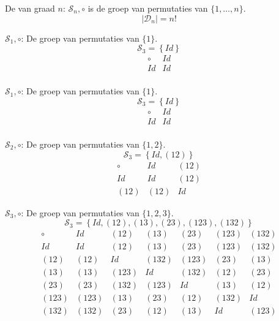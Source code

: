 \documentclass[main.tex]{subfiles}
\begin{document}
\begin{de}
  De  van graad $n$: $\mathcal{S}_{n},\circ$ is de groep van permutaties van $\{ 1,\dotsc,n \}$.
  \[ |\mathcal{D}_{n}| = n! \]
\end{de}

\begin{vb}
  $\mathcal{S}_{1},\circ$: De groep van permutaties van $\{ 1 \}$.
  \[ \mathcal{S}_{3} = \left\{ Id \right\} \]
  \[
  \begin{array}{c|c}
    \circ & Id \\
    \hline
    Id & Id\\
  \end{array}
  \]
\commj {}
\end{vb}

\begin{vb}
  $\mathcal{S}_{1},\circ$: De groep van permutaties van $\{ 1 \}$.
  \[ \mathcal{S}_{3} = \left\{ Id \right\} \]
  \[
  \begin{array}{c|c}
    \circ & Id \\
    \hline
    Id & Id\\
  \end{array}
  \]
\commj {}
\end{vb}

\begin{vb}
  $\mathcal{S}_{2},\circ$: De groep van permutaties van $\{ 1,2 \}$.
  \[ \mathcal{S}_{3} = \left\{ Id, (12) \right\} \]
  \[
  \begin{array}{c|cc}
    \circ & Id & (12) \\
    \hline
    Id & Id & (12)\\
    (12) & (12) & Id
  \end{array}
  \]
\commj {}
\end{vb}

\begin{vb}
  \label{vb:groep-s3}
  $\mathcal{S}_{3},\circ$: De groep van permutaties van $\{ 1,2,3 \}$.
  \[ \mathcal{S}_{3} = \left\{ Id, (12), (13), (23), (123), (132) \right\} \]
  \[
  \begin{array}{c|cccccc}
    \circ & Id & (12) & (13) & (23) & (123) & (132) \\
    \hline
    Id & Id & (12) & (13) & (23) & (123) & (132)\\
    (12) & (12) & Id & (132) & (123) & (23) & (13)\\
    (13) & (13) & (123) & Id & (132) & (12) & (23)\\
    (23) & (23) & (132) & (123) & Id & (13) & (12)\\
    (123) & (123) & (13) & (23) & (12) & (132) & Id\\
    (132) & (132) & (23) & (12) & (13) & Id & (123)\\
  \end{array}
  \]
\commn \cycln
\end{vb}
\end{document}
